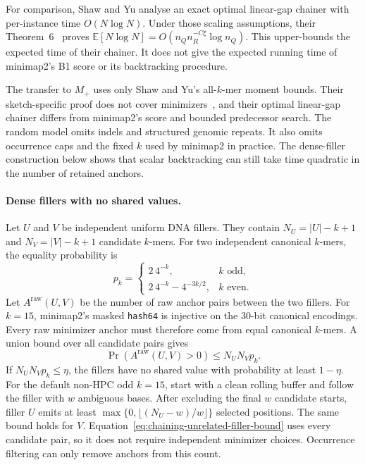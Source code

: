 For comparison, Shaw and Yu analyse an exact optimal linear-gap chainer with
per-instance time \(O(N\log N)\). Under those scaling assumptions, their
Theorem~6~\cite{shaw_yu_seed_chain_extend_2023} proves
\(\mathbb E[N\log N]=O(n_Qn_R^{-C\xi}\log n_Q)\). This
upper-bounds the expected time of their chainer. It does not give the expected
running time of minimap2's B1 score or its backtracking procedure.

The transfer to \(M_+\) uses only Shaw and Yu's all-\(k\)-mer moment bounds.
Their sketch-specific proof does not cover
minimizers~\cite{shaw_yu_seed_chain_extend_2023}, and their optimal linear-gap
chainer differs from minimap2's score and bounded predecessor search. The
random model omits indels and structured genomic repeats. It also omits
occurrence caps and the fixed \(k\) used by minimap2 in practice. The
dense-filler construction below shows that scalar backtracking can still take
time quadratic in the number of retained anchors.

\paragraph{Dense fillers with no shared values.}
Let \(U\) and \(V\) be independent uniform DNA fillers. They contain
\(N_U=|U|-k+1\) and \(N_V=|V|-k+1\) candidate \(k\)-mers. For two independent
canonical \(k\)-mers, the equality probability is
\begin{equation}
  p_k=
  \begin{cases}
    2\,4^{-k}, & k\text{ odd},\\[2pt]
    2\,4^{-k}-4^{-3k/2}, & k\text{ even}.
  \end{cases}
  \label{eq:chaining-canonical-collision-probability}
\end{equation}
Let \(A^{\mathrm{raw}}(U,V)\) be the number of raw anchor pairs between the two
fillers. For \(k=15\), minimap2's masked \texttt{hash64} is injective on the
30-bit canonical encodings. Every raw minimizer anchor must therefore come
from equal canonical \(k\)-mers. A union bound over all candidate pairs gives
\begin{equation}
  \Pr\!\left(A^{\mathrm{raw}}(U,V)>0\right)\leq N_UN_Vp_k.
  \label{eq:chaining-unrelated-filler-bound}
\end{equation}
If \(N_UN_Vp_k\leq\eta\), the fillers have no shared value with probability at
least \(1-\eta\). For the default non-HPC odd \(k=15\), start with a clean
rolling buffer and follow the filler with \(w\) ambiguous bases. After
excluding the final \(w\) candidate starts, filler \(U\) emits at least
\(\max\{0,\lfloor(N_U-w)/w\rfloor\}\) selected positions. The same bound
holds for \(V\).
Equation~\ref{eq:chaining-unrelated-filler-bound} uses every candidate pair, so
it does not require independent minimizer choices. Occurrence filtering can
only remove anchors from this count.

